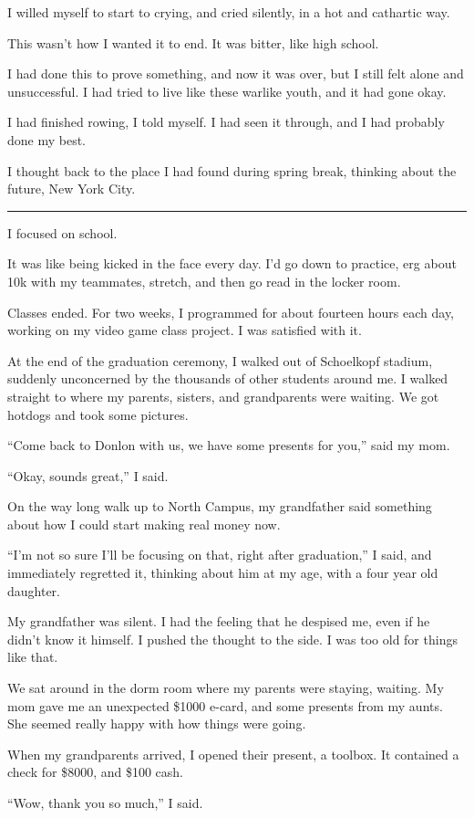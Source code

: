 I willed myself to start to crying, and cried silently, in a hot and cathartic
way.

This wasn't how I wanted it to end.  It was bitter, like high school.

I had done this to prove something, and now it was over, but I still felt alone
and unsuccessful.  I had tried to live like these warlike youth, and it had gone
okay.

I had finished rowing, I told myself.  I had seen it through, and I had probably
done my best.

I thought back to the place I had found during spring break, thinking about the
future, New York City.

\plainfancybreak{12pt}{2}{}

I focused on school.

It was like being kicked in the face every day.  I'd go down to practice, erg
about 10k with my teammates, stretch, and then go read in the locker room.

Classes ended.  For two weeks, I programmed for about fourteen hours each day,
working on my video game class project.  I was satisfied with it.

At the end of the graduation ceremony, I walked out of Schoelkopf stadium,
suddenly unconcerned by the thousands of other students around me.  I walked
straight to where my parents, sisters, and grandparents were waiting.  We got
hotdogs and took some pictures.

``Come back to Donlon with us, we have some presents for you,'' said my mom.

``Okay, sounds great,'' I said.

On the way long walk up to North Campus, my grandfather said something about how
I could start making real money now.

``I'm not so sure I'll be focusing on that, right after graduation,'' I said,
and immediately regretted it, thinking about him at my age, with a four year old
daughter.

My grandfather was silent.  I had the feeling that he despised me, even if he
didn't know it himself.  I pushed the thought to the side.  I was too old for
things like that.

We sat around in the dorm room where my parents were staying, waiting.  My mom
gave me an unexpected \$1000 e-card, and some presents from my aunts.  She
seemed really happy with how things were going.

When my grandparents arrived, I opened their present, a toolbox.  It contained a
check for \$8000, and \$100 cash.

``Wow, thank you so much,'' I said.
